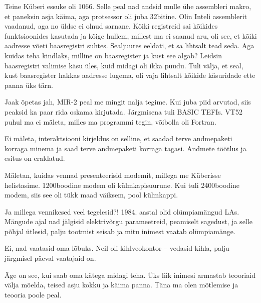 Teine Küberi essuke oli 1066. Selle peal nad andsid mulle ühe
assembleri makro, et paneksin asja käima, aga protsessor oli juba 32bitine. Olin Inteli assemblerit vaadanud, aga no üldse ei olnud 
sarnane. Kõiki registreid sai kõikides funktsioonides kasutada ja kõige 
hullem, millest ma ei saanud aru, oli see, et kõiki aadresse võeti 
baasregistri suhtes. Sealjuures eeldati, et sa lihtsalt 
tead seda. Aga kuidas teha kindlaks, milline on baasregister ja kust see 
algab? Leidsin baasregistri valimise käsu üles, kuid 
midagi oli ikka puudu. Tuli välja, et seal, kust baasregister hakkas aadresse 
lugema, oli vaja lihtsalt kõikide käsuridade ette panna üks 
tärn.


Jaak õpetas jah, MIR-2 peal me mingit nalja 
tegime. Kui juba piid arvutad, siis peaksid ka paar rida oskama kirjutada. Järgmisena tuli BASIC TEFIs. VT52 puhul ma ei mäleta, 
milles ma programmi tegin, võibolla oli Fortran. 


Ei mäleta, interaktsiooni kirjeldus on selline, et saadad 
terve 
andmepaketi korraga minema ja saad terve andmepaketi korraga tagasi. Andmete 
töötlus ja esitus on eraldatud. 


Mäletan, kuidas vennad presenteerisid modemit, millega me Küberisse 
helistasime. 1200boodine modem oli külmkapisuurune. Kui tuli 2400boodine modem, siis see oli tükk maad väiksem, pool külmkappi.

Ja millega vennikesed veel tegelesid?! 1984. aastal olid olümpiamängud LAs. Mängude 
ajal nad jälgisid elektrivõrgu parameetreid, peamiselt sagedust, ja selle põhjal 
ütlesid, palju tootmist seisab ja mitu inimest vaatab olümpiamänge. 


Ei, nad vaatasid oma lõbuks. Neil oli kihlveokontor -- vedasid kihla, palju järgmisel päeval 
vaatajaid on.


Äge on see, kui saab oma kätega midagi teha. Üks liik inimesi armastab teooriaid 
välja mõelda, teised asju kokku 
ja käima panna. Täna ma olen 
mõtlemise ja teooria poole peal.

